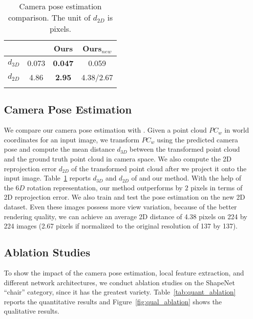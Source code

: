 \begin{table}[]
\hspace*{0.1cm}
\begin{minipage}{.4\textwidth}
    \centering
    \setlength{\arrayrulewidth}{1pt}
    \begin{tabular}{c|ccc}
                    \Xhline{2\arrayrulewidth}
        &  \cite{insafutdinov18pointclouds} & Ours & Ours$_{new}$ \\ \hline
    $d_{3D}$ &  0.073  &  \textbf{0.047}  &  0.059 \\ \hline
    $d_{2D}$  &  4.86  &   \textbf{2.95}  &  4.38/2.67 \\ 
                    \Xhline{2\arrayrulewidth}
    \end{tabular}
    \vspace{3pt}
    \caption {Camera pose estimation comparison. The unit of $d_{2D}$ is pixels.}
\label{tab:camest}
\end{minipage}
\vspace{-10pt}
\end{table}


\vspace{-10pt}
\subsection{Camera Pose Estimation}
\label{sec:exp:cam}
\vspace{-5pt}

We compare our camera pose estimation with \cite{insafutdinov18pointclouds}. Given a point cloud $PC_w$ in world coordinates for an input image, we transform $PC_w$ using the predicted camera pose and compute the mean distance $d_{3D}$ between the transformed point cloud and the ground truth point cloud in camera space. We also compute the 2D reprojection error $d_{2D}$ of the transformed point cloud after we project it onto the input image. Table~\ref{tab:camest} reports $d_{3D}$ and $d_{2D}$ of \cite{insafutdinov18pointclouds} and our method. With the help of the $6D$ rotation representation, our method outperforms \cite{insafutdinov18pointclouds} by $2$ pixels in terms of 2D reprojection error. We also train and test the pose estimation on the new 2D dataset. Even these images possess more view variation, because of the better rendering quality, we can achieve an average 2D distance of 4.38 pixels on 224 by 224 images (2.67 pixels if normalized to the original resolution of 137 by 137).
\subsection{Ablation Studies}
\label{sec:exp:ablation}
\vspace{-5pt}
To show the impact of the camera pose estimation, local feature extraction, and different network architectures, we conduct ablation studies on the ShapeNet ``chair'' category, since it has the greatest variety. Table~\ref{tab:quant_ablation} reports the quantitative results and Figure~\ref{fig:qual_ablation} shows the qualitative results.
\vspace{-5pt}

